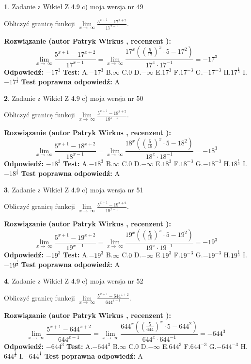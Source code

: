 \documentclass[12pt, a4paper]{article}
\theoremstyle{definition} %
\newtheorem{zad}{}
\newcommand{\zadStart}[1]{\begin{zad}#1\newline}
\newcommand{\zadStop}{\end{zad}}
\newcommand{\rozwStart}[2]{\noindent \textbf{Rozwiązanie (autor #1 , recenzent #2): }\newline}
\newcommand{\rozwStop}{\newline}
\newcommand{\odpStart}{\noindent \textbf{Odpowiedź:}\newline}
\newcommand{\odpStop}{\newline}
\newcommand{\testStart}{\noindent \textbf{Test:}\newline}
\newcommand{\testStop}{\newline}
\newcommand{\kluczStart}{\noindent \textbf{Test poprawna odpowiedź:}\newline}
\newcommand{\kluczStop}{\newline}
\begin{document}
\zadStart{Zadanie z Wikieł Z 4.9 c) moja wersja nr 49}


Obliczyć granicę funkcji  $\lim\limits_{x\to\ \infty}\frac{5^{x+1}-17^{x+2}}{17^{x-1}}$.
\zadStop
\rozwStart{Patryk Wirkus}{}
$$\lim\limits_{x\to\ \infty}\frac{5^{x+1}-17^{x+2}}{17^{x-1}}=\lim\limits_{x\to\ \infty}\frac{17^{x}((\frac{5}{17})^{x}\cdot 5 -17^{2})}{17^{x}\cdot 17^{-1}} = -17^{3}$$
\rozwStop
\odpStart
$-17^{3}$
\odpStop
\testStart
A.$-17^{3}$ B.$\infty$ C.$0$ D.$-\infty$ E.$17^{3}$
F.$17^{-3}$ G.$-17^{-3}$
H.$17^{\frac{1}{3}}$
I.$-17^{\frac{1}{3}}$
\testStop
\kluczStart
A
\kluczStop



\zadStart{Zadanie z Wikieł Z 4.9 c) moja wersja nr 50}


Obliczyć granicę funkcji  $\lim\limits_{x\to\ \infty}\frac{5^{x+1}-18^{x+2}}{18^{x-1}}$.
\zadStop
\rozwStart{Patryk Wirkus}{}
$$\lim\limits_{x\to\ \infty}\frac{5^{x+1}-18^{x+2}}{18^{x-1}}=\lim\limits_{x\to\ \infty}\frac{18^{x}((\frac{5}{18})^{x}\cdot 5 -18^{2})}{18^{x}\cdot 18^{-1}} = -18^{3}$$
\rozwStop
\odpStart
$-18^{3}$
\odpStop
\testStart
A.$-18^{3}$ B.$\infty$ C.$0$ D.$-\infty$ E.$18^{3}$
F.$18^{-3}$ G.$-18^{-3}$
H.$18^{\frac{1}{3}}$
I.$-18^{\frac{1}{3}}$
\testStop
\kluczStart
A
\kluczStop



\zadStart{Zadanie z Wikieł Z 4.9 c) moja wersja nr 51}


Obliczyć granicę funkcji  $\lim\limits_{x\to\ \infty}\frac{5^{x+1}-19^{x+2}}{19^{x-1}}$.
\zadStop
\rozwStart{Patryk Wirkus}{}
$$\lim\limits_{x\to\ \infty}\frac{5^{x+1}-19^{x+2}}{19^{x-1}}=\lim\limits_{x\to\ \infty}\frac{19^{x}((\frac{5}{19})^{x}\cdot 5 -19^{2})}{19^{x}\cdot 19^{-1}} = -19^{3}$$
\rozwStop
\odpStart
$-19^{3}$
\odpStop
\testStart
A.$-19^{3}$ B.$\infty$ C.$0$ D.$-\infty$ E.$19^{3}$
F.$19^{-3}$ G.$-19^{-3}$
H.$19^{\frac{1}{3}}$
I.$-19^{\frac{1}{3}}$
\testStop
\kluczStart
A
\kluczStop



\zadStart{Zadanie z Wikieł Z 4.9 c) moja wersja nr 52}


Obliczyć granicę funkcji  $\lim\limits_{x\to\ \infty}\frac{5^{x+1}-644^{x+2}}{644^{x-1}}$.
\zadStop
\rozwStart{Patryk Wirkus}{}
$$\lim\limits_{x\to\ \infty}\frac{5^{x+1}-644^{x+2}}{644^{x-1}}=\lim\limits_{x\to\ \infty}\frac{644^{x}((\frac{5}{644})^{x}\cdot 5 -644^{2})}{644^{x}\cdot 644^{-1}} = -644^{3}$$
\rozwStop
\odpStart
$-644^{3}$
\odpStop
\testStart
A.$-644^{3}$ B.$\infty$ C.$0$ D.$-\infty$ E.$644^{3}$
F.$644^{-3}$ G.$-644^{-3}$
H.$644^{\frac{1}{3}}$
I.$-644^{\frac{1}{3}}$
\testStop
\kluczStart
A
\kluczStop
\end{document}
